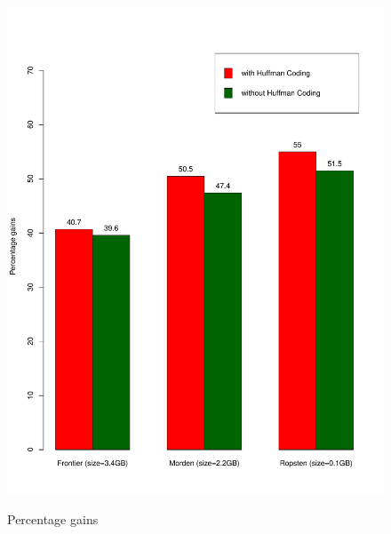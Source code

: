 \begin{figure}[!t]
\begin{floatrow}
{	\includegraphics[scale=0.39]{plots/customgains}
}{ \caption{Percentage gains}
\label{fig:origvscustom}
}
\end{floatrow}
\end{figure}

